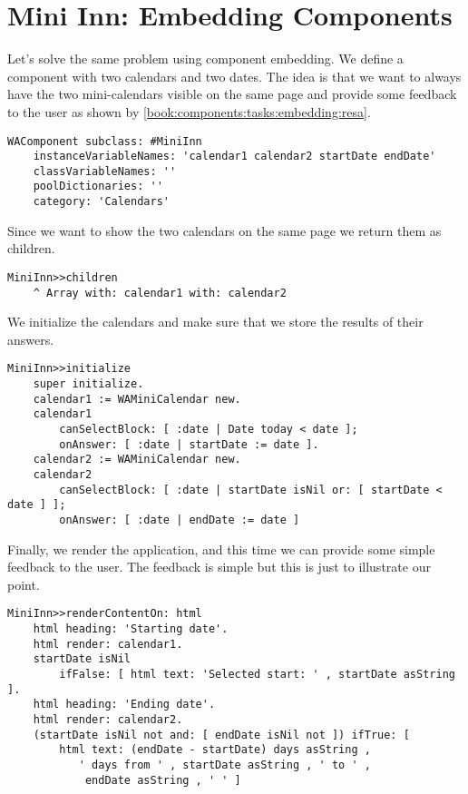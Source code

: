 \documentclass[a4paper,10pt,twoside]{book}
\begin{document}
\section{Mini Inn: Embedding Components}
\label{book:components:tasks:embedding}

Let's solve the same problem using component embedding. We define a component with two calendars and two dates. The idea is that we want to always have the two mini-calendars visible on the same page and provide some feedback to the user as shown by \autoref{book:components:tasks:embedding:resa}.

\begin{lstlisting}
WAComponent subclass: #MiniInn
    instanceVariableNames: 'calendar1 calendar2 startDate endDate'
    classVariableNames: ''
    poolDictionaries: ''
    category: 'Calendars'
\end{lstlisting}

Since we want to show the two calendars on the same page we return them as children.

\begin{lstlisting}
MiniInn>>children
    ^ Array with: calendar1 with: calendar2
\end{lstlisting}

We initialize the calendars and make sure that we store the results of their answers.

\begin{lstlisting}
MiniInn>>initialize
    super initialize.
    calendar1 := WAMiniCalendar new.
    calendar1
        canSelectBlock: [ :date | Date today < date ];
        onAnswer: [ :date | startDate := date ].
    calendar2 := WAMiniCalendar new.
    calendar2
        canSelectBlock: [ :date | startDate isNil or: [ startDate < date ] ];
        onAnswer: [ :date | endDate := date ]
\end{lstlisting}

Finally, we render the application, and this time we can provide some simple feedback to the user. The feedback is simple but this is just to illustrate our point.

\begin{lstlisting}
MiniInn>>renderContentOn: html
    html heading: 'Starting date'.
    html render: calendar1.
    startDate isNil
        ifFalse: [ html text: 'Selected start: ' , startDate asString ].
    html heading: 'Ending date'.
    html render: calendar2.
    (startDate isNil not and: [ endDate isNil not ]) ifTrue: [ 
        html text: (endDate - startDate) days asString , 
           ' days from ' , startDate asString , ' to ' , 
            endDate asString , ' ' ]
\end{lstlisting}
\end{document}
